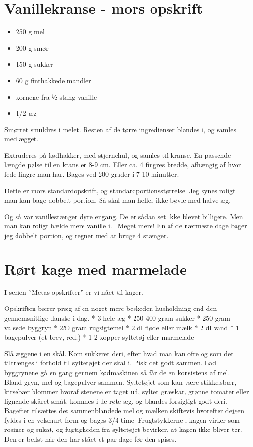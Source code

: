 \documentclass[
]{book}
\providecommand{\tightlist}{%
  \setlength{\itemsep}{0pt}\setlength{\parskip}{0pt}}
\begin{document}
\hypertarget{vanillekranse---mors-opskrift}{%
\section{Vanillekranse - mors opskrift}\label{vanillekranse---mors-opskrift}}

\begin{itemize}
\tightlist
\item
  250 g mel
\item
  200 g smør
\item
  150 g sukker
\item
  60 g finthakkede mandler
\item
  kornene fra ½ stang vanille
\item
  1/2 æg
\end{itemize}

Smørret smuldres i melet. Resten af de tørre ingredienser blandes i, og samles med ægget.

Extruderes på kødhakker, med stjernehul, og samles til kranse. En passende længde pølse til en krans er 8-9 cm. Eller ca. 4 fingres bredde, afhængig af hvor fede fingre man har. Bages ved 200 grader i 7-10 minutter.

Dette er mors standardopskrift, og standardportionsstørrelse. Jeg synes roligt man kan bage dobbelt portion. Så skal man heller ikke bøvle med halve æg.

Og så var vanillestænger dyre engang. De er sådan set ikke blevet billigere. Men man kan roligt hælde mere vanille i.~ Meget mere! En af de nærmeste dage bager jeg dobbelt portion, og regner med at bruge 4 stænger.

\hypertarget{ruxf8rt-kage-med-marmelade}{%
\section{Rørt kage med marmelade}\label{ruxf8rt-kage-med-marmelade}}

I serien ``Metas opskrifter'' er vi nået til kager.

Opskriften bærer præg af en noget mere beskeden husholdning end den gennemsnitlige danske i dag.
* 3 hele æg
* 250-400 gram sukker
* 250 gram valsede byggryn
* 250 gram rugsigtemel
* 2 dl fløde eller mælk
* 2 dl vand
* 1 bagepulver (et brev, red.)
* 1-2 kopper syltetøj eller marmelade

Slå æggene i en skål. Kom sukkeret deri, efter hvad man kan ofre og som det tiltrænges i forhold til syltetøjet der skal i.
Pisk det godt sammen.
Lad byggrynene gå en gang gennem kødmaskinen så får de en konsistens af mel.
Bland gryn, mel og bagepulver sammen. Syltetøjet som kan være stikkelsbær, kirsebær blommer hvoraf stenene er taget ud, syltet græskar, grønne tomater eller lignende skåret småt, kommes i de
røte æg, og blandes forsigtigt godt deri.
Bagefter tilsættes det sammenblandede mel og mælken skiftevis hvorefter dejgen fyldes i en velsmurt form og bages 3/4 time.
Frugtstykkerne i kagen virker som rosiner og sukat, og fugtigheden fra syltetøjet bevirker, at kagen ikke bliver tør. Den er bedst når den har stået et par dage før den spises.
\end{document}
